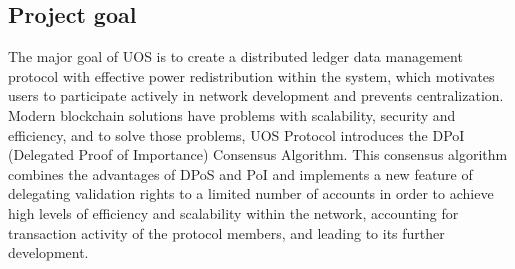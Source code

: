 \documentclass[a4paper,12pt]{article}
\begin{document}

\subsection{Project goal}

The major goal of U{\degree}OS is to create a distributed ledger data management protocol with effective power redistribution within the system, which motivates users to participate actively in network development and prevents centralization. Modern blockchain solutions have problems with scalability, security and efficiency, and to solve those problems, U{\degree}OS Protocol introduces the DPoI (Delegated Proof of Importance) Consensus Algorithm. This consensus algorithm combines the advantages of DPoS and PoI and implements a new feature of delegating validation rights to a limited number of accounts in order to achieve high levels of efficiency and scalability within the network, accounting for transaction activity of the protocol members, and leading to its further development.
\end{document}
